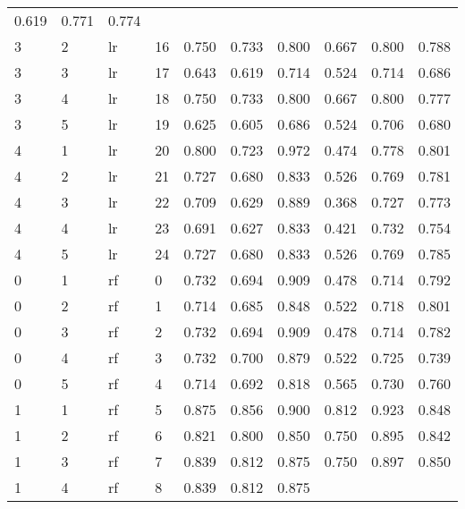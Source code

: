 \begin{table}[ht]
\begin{adjustbox}{width=\textwidth}
\begin{tabular}{llllrrrrrr}
 0.619 & 0.771 & 0.774 \\
   3 &           2 &    lr &          16 & 0.750 &  0.733 &        0.800 &       
 0.667 & 0.800 & 0.788 \\
   3 &           3 &    lr &          17 & 0.643 &  0.619 &        0.714 &       
 0.524 & 0.714 & 0.686 \\
   3 &           4 &    lr &          18 & 0.750 &  0.733 &        0.800 &       
 0.667 & 0.800 & 0.777 \\
   3 &           5 &    lr &          19 & 0.625 &  0.605 &        0.686 &       
 0.524 & 0.706 & 0.680 \\
   4 &           1 &    lr &          20 & 0.800 &  0.723 &        0.972 &       
 0.474 & 0.778 & 0.801 \\
   4 &           2 &    lr &          21 & 0.727 &  0.680 &        0.833 &       
 0.526 & 0.769 & 0.781 \\
   4 &           3 &    lr &          22 & 0.709 &  0.629 &        0.889 &       
 0.368 & 0.727 & 0.773 \\
   4 &           4 &    lr &          23 & 0.691 &  0.627 &        0.833 &       
 0.421 & 0.732 & 0.754 \\
   4 &           5 &    lr &          24 & 0.727 &  0.680 &        0.833 &       
 0.526 & 0.769 & 0.785 \\
   0 &           1 &    rf &           0 & 0.732 &  0.694 &        0.909 &       
 0.478 & 0.714 & 0.792 \\
   0 &           2 &    rf &           1 & 0.714 &  0.685 &        0.848 &       
 0.522 & 0.718 & 0.801 \\
   0 &           3 &    rf &           2 & 0.732 &  0.694 &        0.909 &       
 0.478 & 0.714 & 0.782 \\
   0 &           4 &    rf &           3 & 0.732 &  0.700 &        0.879 &       
 0.522 & 0.725 & 0.739 \\
   0 &           5 &    rf &           4 & 0.714 &  0.692 &        0.818 &       
 0.565 & 0.730 & 0.760 \\
   1 &           1 &    rf &           5 & 0.875 &  0.856 &        0.900 &       
 0.812 & 0.923 & 0.848 \\
   1 &           2 &    rf &           6 & 0.821 &  0.800 &        0.850 &       
 0.750 & 0.895 & 0.842 \\
   1 &           3 &    rf &           7 & 0.839 &  0.812 &        0.875 &       
 0.750 & 0.897 & 0.850 \\
   1 &           4 &    rf &           8 & 0.839 &  0.812 &        0.875 &       

\end{tabular}
\end{adjustbox}
\end{table}
